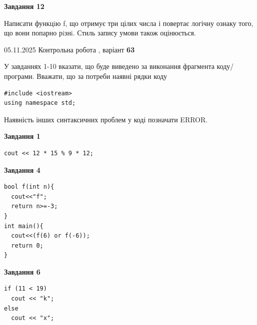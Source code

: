 \documentclass[12pt, ukrainian]{article}
\begin{document}
{\begin {large}
\begin{minipage}[t]{11.0cm}
\begin{center}
\textbf{Завдання 12}
\end{center}

Написати функцiю f, що отримує три цілих числа і повертає логічну ознаку того, що вони попарно рiзнi. Стиль запису умови також оцінюється.\par

\end{minipage}

\end {large}}
\newpage

{\Large{05.11.2025 Контрольна робота , варіант  \No \textbf { 63 }\par}}
{
\begin {large}
У завданнях 1-10 вказати, що буде виведено за виконання фрагмента коду/про\-гра\-ми.
Вважати, що за потреби наявні рядки коду
\begin{verbatim}
#include <iostream>
using namespace std;
\end{verbatim}
Наявність інших синтаксичних проблем у коді позначати ERROR.

\begin{minipage}[t]{7.0cm}

\begin{center}
\textbf{Завдання 1}
\end{center}
\vspace{-8mm}

\begin{verbatim}
cout << 12 * 15 % 9 * 12;
\end{verbatim}



\begin{center}
\textbf{Завдання 4}
\end{center}
\vspace{-8mm}

\begin{verbatim}
bool f(int n){
  cout<<"f";
  return n>=-3;
}
int main(){
  cout<<(f(6) or f(-6));
  return 0;
}
\end{verbatim}



\begin{center}
\textbf{Завдання 6}
\end{center}
\vspace{-8mm}

\begin{verbatim}
if (11 < 19)
  cout << "k";
else
  cout << "x";
\end{verbatim}




\end{minipage}
\end{large}}
\end{document}

